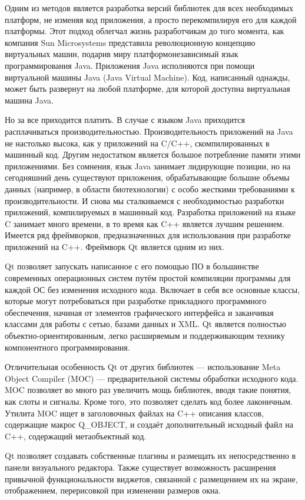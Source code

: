 \documentclass[a4paper,14pt]{extreport}
\begin{document}
	Одним из методов является разработка версий библиотек для всех необходимых платформ, не изменяя код приложения, а просто перекомпилируя его для каждой платформы. Этот подход облегчал жизнь разработчикам до того момента, как компания Sun Microsystems представила революционную концепцию виртуальных машин, подарив миру платформонезависимый язык программирования Java. Приложения Java исполняются при помощи виртуальной машины Java (Java Virtual Machine). Код, написанный однажды, может быть развернут на любой платформе, для которой доступна виртуальная машина Java.
	 
	Но за все приходится платить. В случае с языком Java приходится расплачиваться производительностью. Производительность приложений на Java не настолько высока, как у приложений на C/C++, скомпилированных в машинный код. Другим недостатком является большое потребление памяти этими приложениями. Без сомнения, язык Java занимает лидирующие позиции, но на сегодняшний день существуют приложения, обрабатывающие большие объемы данных (например, в области биотехнологии) с особо жесткими требованиями к производительности. И снова мы сталкиваемся с необходимостью разработки приложений, компилируемых в машинный код. Разработка приложений на языке C занимает много времени, в то время как C++ является лучшим решением. Имеется ряд фреймворков, предназначенных для использования при разработке приложений на C++. Фреймворк Qt является одним из них. 
	
	Qt позволяет запускать написанное с его помощью ПО в большинстве современных операционных систем путём простой компиляции программы для каждой ОС без изменения исходного кода. Включает в себя все основные классы, которые могут потребоваться при разработке прикладного программного обеспечения, начиная от элементов графического интерфейса и заканчивая классами для работы с сетью, базами данных и XML. Qt является полностью объектно-ориентированным, легко расширяемым и поддерживающим технику компонентного программирования.
	
	Отличительная особенность Qt от других библиотек — использование Meta Object Compiler (MOC) — предварительной системы обработки исходного кода. MOC позволяет во много раз увеличить мощь библиотек, вводя такие понятия, как слоты и сигналы. Кроме того, это позволяет сделать код более лаконичным. Утилита MOC ищет в заголовочных файлах на C++ описания классов, содержащие макрос Q\_OBJECT, и создаёт дополнительный исходный файл на C++, содержащий метаобъектный код.
	
	Qt позволяет создавать собственные плагины и размещать их непосредственно в панели визуального редактора. Также существует возможность расширения привычной функциональности виджетов, связанной с размещением их на экране, отображением, перерисовкой при изменении размеров окна.
	
\end{document}
